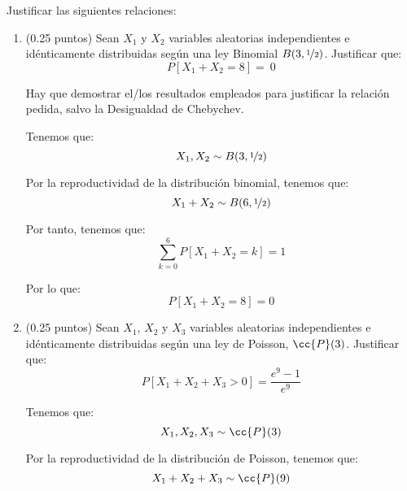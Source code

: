 \documentclass[12pt]{article}
\begin{document}
\begin{ejercicio}[1.5 puntos]
        Justificar las siguientes relaciones:
        \begin{enumerate}
            \item (0.25 puntos) Sean $X_1$ y $X_2$ variables aleatorias independientes e idénticamente distribuidas según una ley Binomial $B(3, \nicefrac{1}{2})$. Justificar que: $$P[X_1 + X_2 = 8] =~0$$
            \begin{observacion}
                Hay que demostrar el/los resultados empleados para justificar la relación pedida, salvo la Desigualdad de Chebychev.
            \end{observacion}
            
            Tenemos que:
            \begin{equation*}
                X_1, X_2 \sim B(3, \nicefrac{1}{2}) 
            \end{equation*}

            Por la reproductividad de la distribución binomial, tenemos que:
            \begin{equation*}
                X_1 + X_2 \sim B(6, \nicefrac{1}{2})
            \end{equation*}

            Por tanto, tenemos que:
            \begin{equation*}
                \sum_{k=0}^6 P[X_1 + X_2 = k] = 1
            \end{equation*}

            Por lo que:
            \begin{equation*}
                P[X_1 + X_2 = 8] = 0
            \end{equation*}
            \item (0.25 puntos) Sean $X_1$, $X_2$ y $X_3$ variables aleatorias independientes e idénticamente distribuidas según una ley de Poisson, $\cc{P}(3)$. Justificar que: $$P[X_1 + X_2 + X_3 > 0] = \frac{e^9 - 1}{e^9}$$
            
            Tenemos que:
            \begin{equation*}
                X_1, X_2, X_3 \sim \cc{P}(3)
            \end{equation*}

            Por la reproductividad de la distribución de Poisson, tenemos que:
            \begin{equation*}
                X_1 + X_2 + X_3 \sim \cc{P}(9)
            \end{equation*}


\end{enumerate}
\end{ejercicio}
\end{document}
